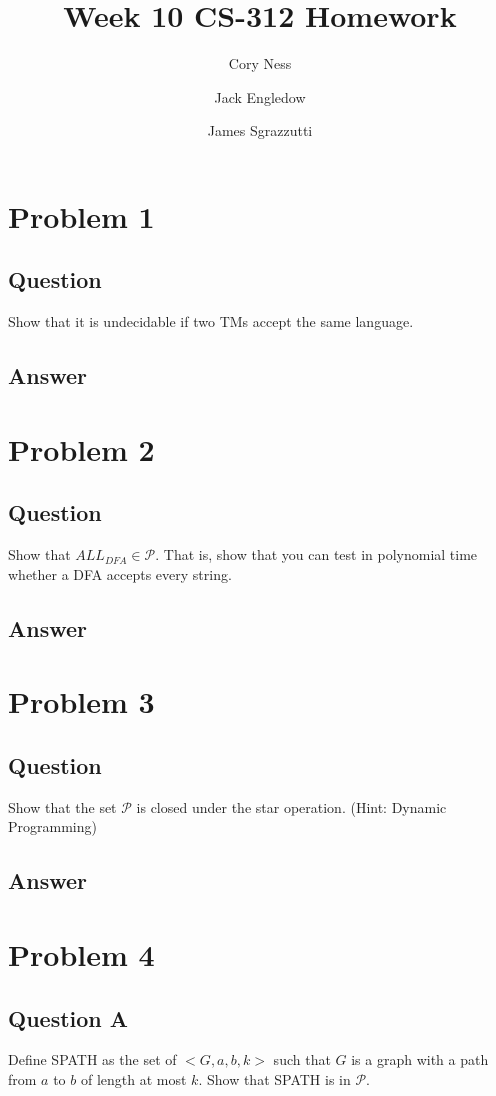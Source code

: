 \documentclass[12pt, a4paper]{article}
\title{Week 10 CS-312 Homework}
\author{
	Cory Ness
	\and
	Jack Engledow
	\and
	James Sgrazzutti
}
\begin{document}
\maketitle

\section{Problem 1}
\subsection{Question}
Show that it is undecidable if two TMs accept the same language.
\subsection{Answer}

\section{Problem 2}
\subsection{Question}
Show that $ALL_{DFA} \in \mathcal{P}$. That is, show that you can test in polynomial time whether a DFA accepts every string.
\subsection{Answer}

\section{Problem 3}
\subsection{Question}
Show that the set $\mathcal{P}$ is closed under the star operation. (Hint: Dynamic Programming)
\subsection{Answer}

\section{Problem 4}
\subsection{Question A}
Define SPATH as the set of $<G, a, b, k>$ such that $G$ is a graph with a path from $a$ to $b$ of length at most $k$. Show that SPATH is in $\mathcal{P}$.
\end{document}
